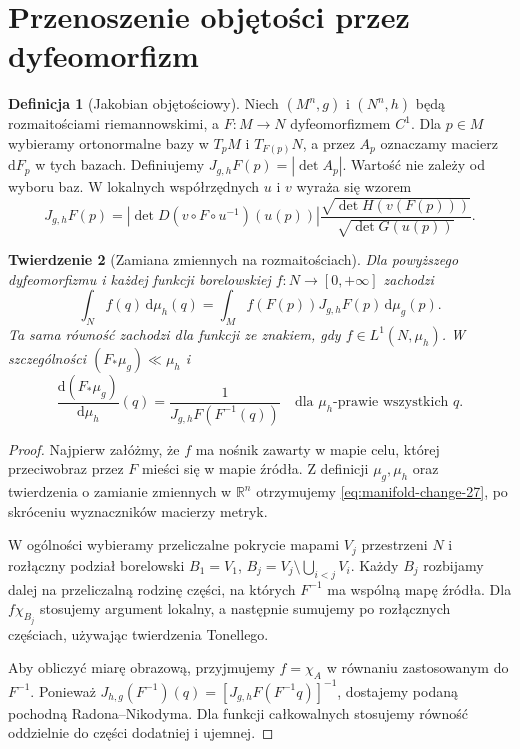 \documentclass[11pt,a4paper,oneside]{book}
\numberwithin{equation}{chapter}
\theoremstyle{plain}
\newtheorem{twierdzenie}{Twierdzenie}[chapter]
\theoremstyle{definition}
\newtheorem{definicja}[twierdzenie]{Definicja}
\theoremstyle{remark}
\begin{document}
\section{Przenoszenie objętości przez dyfeomorfizm}
\begin{definicja}[Jakobian objętościowy]
\label{def:volume-jacobian-27}
Niech $(M^n,g)$ i $(N^n,h)$ będą rozmaitościami
riemannowskimi, a $F:M\to N$ dyfeomorfizmem $C^1$.
Dla $p\in M$ wybieramy ortonormalne bazy
w $T_pM$ i $T_{F(p)}N$, a przez $A_p$ oznaczamy
macierz $\mathrm dF_p$ w tych bazach. Definiujemy
$J_{g,h}F(p)=|\det A_p|$. Wartość nie zależy
od wyboru baz. W lokalnych współrzędnych $u$ i $v$
wyraża się wzorem
\[
 J_{g,h}F(p)=|\det D(v\circ F\circ u^{-1})(u(p))|
 \frac{\sqrt{\det H(v(F(p)))}}{\sqrt{\det G(u(p))}}.
\]
\end{definicja}

\begin{twierdzenie}[Zamiana zmiennych na rozmaitościach]
\label{thm:manifold-change-27}
Dla powyższego dyfeomorfizmu i każdej funkcji
borelowskiej $f:N\to[0,+\infty]$ zachodzi
\begin{equation}\label{eq:manifold-change-27}
 \int_N f(q)\,\mathrm d\mu_h(q)=
 \int_M f(F(p))J_{g,h}F(p)\,\mathrm d\mu_g(p).
\end{equation}
Ta sama równość zachodzi dla funkcji ze znakiem,
gdy $f\in L^1(N,\mu_h)$.
W szczególności $(F_*\mu_g)\ll\mu_h$ i
\[
 \frac{\mathrm d(F_*\mu_g)}{\mathrm d\mu_h}(q)
 =\frac{1}{J_{g,h}F(F^{-1}(q))}
 \quad\text{dla }\mu_h\text{-prawie wszystkich }q.
\]
\end{twierdzenie}
\begin{proof}
Najpierw załóżmy, że $f$ ma nośnik zawarty
w mapie celu, której przeciwobraz przez $F$
mieści się w mapie źródła. Z definicji
$\mu_g,\mu_h$ oraz twierdzenia o zamianie
zmiennych w $\mathbb R^n$ otrzymujemy
\eqref{eq:manifold-change-27}, po skróceniu
wyznaczników macierzy metryk.

W ogólności wybieramy przeliczalne pokrycie
mapami $V_j$ przestrzeni $N$ i rozłączny podział
borelowski $B_1=V_1$, $B_j=V_j\setminus
\bigcup_{i<j}V_i$. Każdy $B_j$ rozbijamy dalej
na przeliczalną rodzinę części, na których
$F^{-1}$ ma wspólną mapę źródła. Dla
$f\chi_{B_j}$ stosujemy argument lokalny,
a następnie sumujemy po rozłącznych częściach,
używając twierdzenia Tonellego.

Aby obliczyć miarę obrazową, przyjmujemy
$f=\chi_A$ w równaniu zastosowanym do $F^{-1}$.
Ponieważ
$J_{h,g}(F^{-1})(q)=[J_{g,h}F(F^{-1}q)]^{-1}$,
dostajemy podaną pochodną Radona--Nikodyma.
Dla funkcji całkowalnych stosujemy równość
oddzielnie do części dodatniej i ujemnej.
\end{proof}
\end{document}
